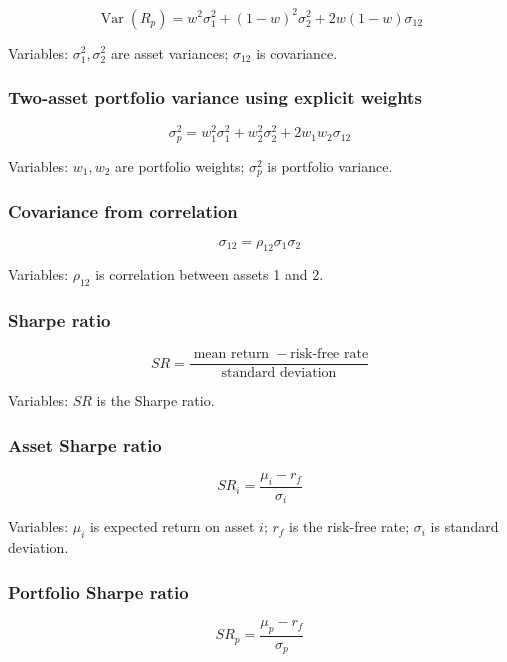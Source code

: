 \documentclass[
  8pt,
  twocolumn]{extarticle}
\begin{document}
\[
\operatorname{Var}(R_p)=w^2\sigma_1^2+(1-w)^2\sigma_2^2+2w(1-w)\sigma_{12}
\]

Variables: \(\sigma_1^2,\sigma_2^2\) are asset variances;
\(\sigma_{12}\) is covariance.

\subsubsection{Two-asset portfolio variance using explicit
weights}\label{two-asset-portfolio-variance-using-explicit-weights}

\[
\sigma_p^2=w_1^2\sigma_1^2+w_2^2\sigma_2^2+2w_1w_2\sigma_{12}
\]

Variables: \(w_1,w_2\) are portfolio weights; \(\sigma_p^2\) is
portfolio variance.

\subsubsection{Covariance from
correlation}\label{covariance-from-correlation-1}

\[
\sigma_{12}=\rho_{12}\sigma_1\sigma_2
\]

Variables: \(\rho_{12}\) is correlation between assets 1 and 2.

\subsubsection{Sharpe ratio}\label{sharpe-ratio}

\[
SR=\frac{\operatorname{mean\ return}-\text{risk-free rate}}{\text{standard deviation}}
\]

Variables: \(SR\) is the Sharpe ratio.

\subsubsection{Asset Sharpe ratio}\label{asset-sharpe-ratio}

\[
SR_i=\frac{\mu_i-r_f}{\sigma_i}
\]

Variables: \(\mu_i\) is expected return on asset \(i\); \(r_f\) is the
risk-free rate; \(\sigma_i\) is standard deviation.

\subsubsection{Portfolio Sharpe ratio}\label{portfolio-sharpe-ratio}

\[
SR_p=\frac{\mu_p-r_f}{\sigma_p}
\]
\end{document}
